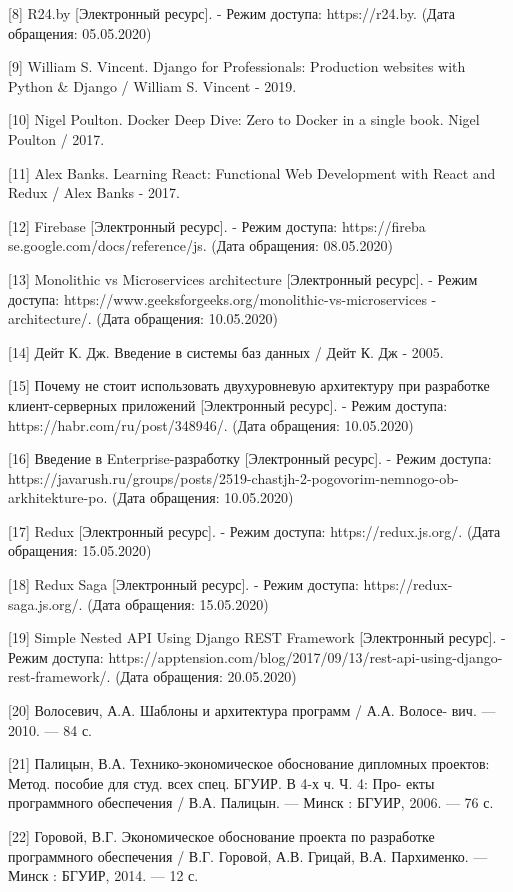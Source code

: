 [8] R24.by [Электронный ресурс]. - Режим доступа: https://r24.by. (Дата обращения: 05.05.2020)

[9] William S. Vincent. Django for Professionals: Production websites with Python \& Django / William S. Vincent - 2019.

[10] Nigel Poulton. Docker Deep Dive: Zero to Docker in a single book. Nigel Poulton / 2017.


[11] Alex Banks. Learning React: Functional Web Development with React and Redux / Alex Banks - 2017.

[12] Firebase [Электронный ресурс]. - Режим доступа: https://fireba  \linebreak se.google.com/docs/reference/js. (Дата обращения: 08.05.2020)

[13] Monolithic vs Microservices architecture [Электронный ресурс]. - Режим доступа: https://www.geeksforgeeks.org/monolithic-vs-microservices -architecture/. (Дата обращения: 10.05.2020)

[14] Дейт К. Дж. Введение в системы баз данных / Дейт К. Дж - 2005.

[15] Почему не стоит использовать двухуровневую архитектуру при разработке клиент-серверных приложений [Электронный ресурс]. - Режим доступа: https://habr.com/ru/post/348946/. (Дата обращения: 10.05.2020)

[16] Введение в Enterprise-разработку [Электронный ресурс]. - Режим доступа: https://javarush.ru/groups/posts/2519-chastjh-2-pogovorim-nemnogo-ob-arkhitekture-po. (Дата обращения: 10.05.2020)

[17] Redux [Электронный ресурс]. - Режим доступа: https://redux.js.org/. (Дата обращения: 15.05.2020)

[18] Redux Saga [Электронный ресурс]. - Режим доступа: https://redux-saga.js.org/. (Дата обращения: 15.05.2020)

[19] Simple Nested API Using Django REST Framework [Электронный ресурс]. - Режим доступа: https://apptension.com/blog/2017/09/13/rest-api-using-django-rest-framework/. (Дата обращения: 20.05.2020)

[20] Волосевич, А.А. Шаблоны и архитектура программ / А.А. Волосе- вич. — 2010. — 84 с.

[21] Палицын, В.А. Технико-экономическое обоснование дипломных проектов: Метод. пособие для студ. всех спец. БГУИР. В 4-х ч. Ч. 4: Про- екты программного обеспечения / В.А. Палицын. — Минск : БГУИР, 2006. — 76 с.

[22] Горовой, В.Г. Экономическое обоснование проекта по разработке программного обеспечения / В.Г. Горовой, А.В. Грицай, В.А. Пархименко. — Минск : БГУИР, 2014. — 12 с.
